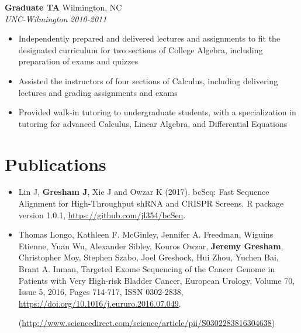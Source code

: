 \documentclass[10pt]{article}
\begin{document}
\noindent
{\bf Graduate TA} \hfill Wilmington, NC\\
{\it UNC-Wilmington} \hfill {\it 2010-2011}
  
\begin{itemize}
  \setlength{\itemsep}{0pt}
  
\item Independently prepared and delivered lectures and assignments to fit the designated curriculum for two sections of College Algebra, including preparation of exams and quizzes

\item Assisted the instructors of four sections of Calculus, including delivering lectures and grading assignments and exams

\item Provided walk-in tutoring to undergraduate students, with a specialization in tutoring for advanced Calculus, Linear Algebra, and Differential Equations

\end{itemize}


\section*{Publications}
\begin{itemize}
\setlength{\itemsep}{0pt}

  \item Lin J, {\bf Gresham J}, Xie J and Owzar K (2017). bcSeq: Fast Sequence
  Alignment for High-Throughput shRNA and CRISPR Screens. R package version
  1.0.1, \href{https://github.com/jl354/bcSeq}{https://github.com/jl354/bcSeq}.

  \item Thomas Longo, Kathleen F. McGinley, Jennifer A. Freedman,
  Wiguins Etienne, Yuan Wu, Alexander Sibley, Kouros Owzar, {\bf Jeremy Gresham},
  Christopher Moy, Stephen Szabo, Joel Greshock, Hui Zhou, Yuchen Bai,
  Brant A. Inman, Targeted Exome Sequencing of the Cancer Genome in Patients
  with Very High-risk Bladder Cancer, European Urology, Volume 70, Issue 5,
   2016, Pages 714-717, ISSN 0302-2838,
   \href{https://doi.org/10.1016/j.eururo.2016.07.049}{https://doi.org/10.1016/j.eururo.2016.07.049}.

   (\href{http://www.sciencedirect.com/science/article/pii/S0302283816304638}{http://www.sciencedirect.com/science/article/pii/S0302283816304638})


\end{itemize}
\end{document}
